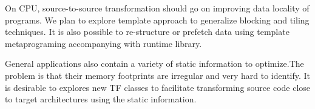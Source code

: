 \documentclass[10pt, conference, compsocconf]{IEEEtran}
\begin{document}
On CPU, source-to-source transformation should go on improving data
locality of programs. We plan to explore template approach to  generalize
blocking and tiling techniques.  It is also possible to re-structure
or prefetch data using template metaprograming accompanying with
runtime library.

General applications also contain a variety of static information to
optimize.The problem is that their memory footprints are irregular and
very hard to identify. It is desirable to explores new TF classes to facilitate
transforming source code close to target architectures using the static
information.







%
%
%
\end{document}

